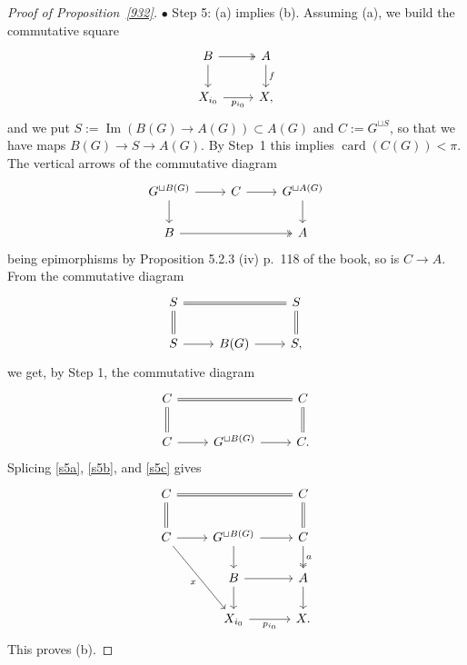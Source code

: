\documentclass[12pt]{article}
\theoremstyle{remark}
\theoremstyle{definition}
\newcommand{\bu}{\bullet}
\newcommand{\nn}{\noindent}
\DeclareMathOperator{\card}{card}
\DeclareMathOperator{\Ima}{Im}
\begin{document}
\begin{proof}[Proof of Proposition~\ref{932}]
\nn$\bu$ Step 5: (a) implies (b). Assuming (a), we build the commutative square 
%
\begin{equation}\label{s5a}
\begin{tikzcd}
B\ar[two heads]{r}\ar{d}&A\ar{d}{f}\\ 
X_{i_0}\ar{r}[swap]{p_{i_0}}&X,
\end{tikzcd}
\end{equation}
% 
and we put $S:=\Ima(B(G)\to A(G))\subset A(G)$ and $C:=G^{\sqcup S}$, so that we have maps $B(G)\to S\to A(G)$. By Step~1 this implies $\card(C(G))<\pi$. The vertical arrows of the commutative diagram 
%
\begin{equation}\label{s5b}
\begin{tikzcd}
G^{\sqcup B(G)}\ar{r}\ar{d}&C\ar{r}&G^{\sqcup A(G)}\ar{d}\\ 
B\ar[two heads]{rr}&&A
\end{tikzcd}
\end{equation} 
%
being epimorphisms by Proposition 5.2.3 (iv) p.~118 of the book, so is $C\to A$. From the commutative diagram 
$$
\begin{tikzcd}
S\ar[equal]{rr}\ar[equal]{d}&&S\ar[equal]{d}\\ 
S\ar{r}&B(G)\ar{r}&S,
\end{tikzcd}
$$ 
we get, by Step 1, the commutative diagram 
%
\begin{equation}\label{s5c}
\begin{tikzcd}
C\ar[equal]{rr}\ar[equal]{d}&&C\ar[equal]{d}\\ 
C\ar{r}&G^{\sqcup B(G)}\ar{r}&C.
\end{tikzcd}
\end{equation} 
%
Splicing \eqref{s5a}, \eqref{s5b}, and \eqref{s5c} gives 
$$
\begin{tikzcd}
C\ar[equal]{rr}\ar[equal]{d}&&C\ar[equal]{d}\\ 
C\ar{r}\ar{rdd}[swap]{x}&G^{\sqcup B(G)}\ar{r}\ar{d}&C\ar[two heads]{d}{a}\\ 
{}&B\ar{r}\ar{d}&A\ar{d}\\ 
{}&X_{i_0}\ar{r}[swap]{p_{i_0}}&X.
\end{tikzcd}
$$ 
This proves (b).


\end{proof}
\end{document}
